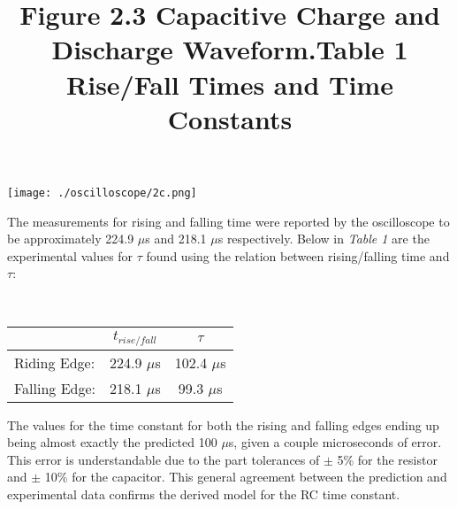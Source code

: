 \documentclass[12pt]{article}
\begin{document}
\title{\textbf{Figure 2.3} Capacitive Charge and Discharge Waveform.}
\begin{center}
 \texttt{[image: ./oscilloscope/2c.png]}
\end{center}
The measurements for rising and falling time were reported by the oscilloscope to be approximately 224.9 $\mu$s and 218.1 $\mu$s respectively. Below in \textit{Table 1} are the experimental values for $\tau$ found using the relation between rising/falling time and $\tau$:
\begin{center}
\title{\textbf{Table 1} Rise/Fall Times and Time Constants}\\\vspace{6pt}
\renewcommand{\arraystretch}{1.25}
\begin{tabular}{|l|c|c|}
\hline
&$t_{rise/fall}$&$\tau$\\
\hline
Riding Edge:& 224.9 $\mu$s&102.4 $\mu$s\\
\hline
Falling Edge:& 218.1 $\mu$s &99.3 $\mu$s\\
\hline
\end{tabular}
\end{center} 
The values for the time constant for both the rising and falling edges ending up being almost exactly the predicted 100 $\mu$s, given a couple microseconds of error. This error is understandable due to the part tolerances of $\pm$ 5\% for the resistor and $\pm$ 10\% for the capacitor. This general agreement between the prediction and experimental data confirms the derived model for the RC time constant.
\end{document}
